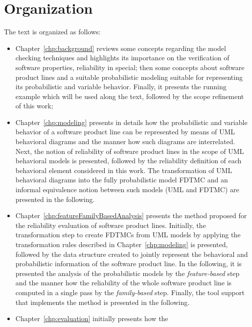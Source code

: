 \section{Organization \label{sec:organization}}

The text is organized as follows:

\begin{itemize}
	\item Chapter~\ref{chp:background} reviews some concepts regarding the
		model checking techniques and highlights its importance on the
		verification of software properties, reliability in special;
		then some concepts about software product lines and a suitable
		probabilistic modeling suitable for representing its
		probabilistic and variable behavior. Finally, it presents the
		running example which will be used along the text, followed by
		the scope refinement of this work;
	\item Chapter~\ref{chp:modeling} presents in details how the
		probabilistic and variable behavior of a software product line
		can be represented by means of UML behavioral diagrams and the
		manner how such diagrams are interrelated. Next, the
		notion of reliability of software product lines in the scope of
		UML behavioral models is presented, followed by the reliability
		definition of each behavioral element considered in this work.
		The transformation of UML behavioral diagrams into the fully
		probabilistic model FDTMC and an informal equivalence notion
		between such models (UML and FDTMC) are presented in the
		following. 
	\item Chapter~\ref{chp:featureFamilyBasedAnalysis} presents the method
		proposed for the reliability evaluation of software product
		lines. Initially, the transformation step to create FDTMCs from
		UML models by applying the transformation rules described in
		Chapter~\ref{chp:modeling} is presented, followed by the data
		structure created to jointly represent the behavioral and
		probabilistic information of the software product line. In the
		following, it is presented the analysis of the probabilistic
		models by the \emph{feature-based} step and the manner how the
		reliability of the whole software product line is computed in a
		single pass by the \emph{family-based} step. Finally, the tool
		support that implements the method is presented in the
		following.
	\item Chapter~\ref{chp:evaluation} initially presents how the

\end{itemize}
